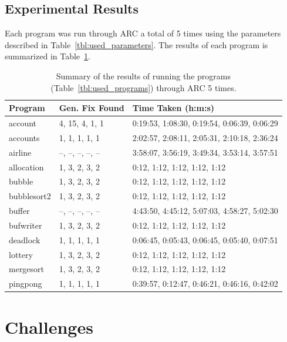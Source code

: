 \documentclass{llncs}
\begin{document}
\subsection{Experimental Results}
\label{sec:experimental_results}

Each program was run through ARC a total of 5 times using the parameters
described in Table~\ref{tbl:used_parameters}. The results of each program is
summarized in Table~\ref{tbl:summary_results}.

\begin{table}%
\caption{Summary of the results of running the programs
(Table~\ref{tbl:used_programs}) through ARC 5 times.}
\begin{center}
\lstset{basicstyle=\scriptsize}
\begin{tabular}{|l|l|l|}
\hline
\textbf{Program} & \textbf{Gen. Fix Found} & \textbf{Time Taken (h:m:s)}\\
\hline
account & 4, 15, 4, 1, 1 & 0:19:53, 1:08:30, 0:19:54, 0:06:39, 0:06:29\\
\hline
accounts & 1, 1, 1, 1, 1 & 2:02:57, 2:08:11, 2:05:31, 2:10:18, 2:36:24\\
\hline
airline & --, --, --, --, -- & 3:58:07, 3:56:19, 3:49:34, 3:53:14, 3:57:51\\
\hline
allocation & 1, 3, 2, 3, 2 & 0:12, 1:12, 1:12, 1:12, 1:12\\
\hline
bubble & 1, 3, 2, 3, 2 & 0:12, 1:12, 1:12, 1:12, 1:12\\
\hline
bubblesort2 & 1, 3, 2, 3, 2 & 0:12, 1:12, 1:12, 1:12, 1:12\\
\hline
buffer & --, --, --, --, -- & 4:43:50, 4:45:12, 5:07:03, 4:58:27, 5:02:30\\
\hline
bufwriter & 1, 3, 2, 3, 2 & 0:12, 1:12, 1:12, 1:12, 1:12\\
\hline
deadlock & 1, 1, 1, 1, 1 & 0:06:45, 0:05:43, 0:06:45, 0:05:40, 0:07:51\\
\hline
lottery & 1, 3, 2, 3, 2 & 0:12, 1:12, 1:12, 1:12, 1:12\\
\hline
mergesort & 1, 3, 2, 3, 2 & 0:12, 1:12, 1:12, 1:12, 1:12\\
\hline
pingpong & 1, 1, 1, 1, 1 & 0:39:57, 0:12:47, 0:46:21, 0:46:16, 0:42:02\\
\hline
\end{tabular}
\label{tbl:summary_results}
\end{center}
\end{table}


\section{Challenges}
\label{sec:challenges}
\end{document}

